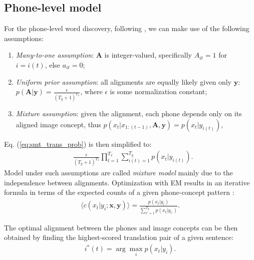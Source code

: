 \documentclass[journal]{IEEEtran}
\begin{document}
\subsection{Phone-level model}
 For the phone-level word discovery, following \cite{Brown92}, we can make use of the following assumptions:
\begin{enumerate}
    \item \textit{Many-to-one assumption}: $\mathbf{A}$ is integer-valued, specifically $A_{it}=1$ for $i=i(t)$, else $a_{it}=0$;
    \item \textit{Uniform prior assumption}: all alignments are equally likely given only $\mathbf{y}$: $p(\mathbf A|\mathbf y) = \frac{\epsilon}{(T_y+1)^{T_x}}$, where $\epsilon$ is some normalization constant;
    \item \textit{Mixture assumption}: given the alignment,
each phone depends only on its aligned image concept, thus
$p(x_t|x_{1:(t-1)},\mathbf{A},\mathbf{y})=p(x_t|y_{i(t)})$,
\end{enumerate}
Eq. (\ref{eq:smt_trans_prob}) is then simplified to:
\begin{align}
    &\frac{\epsilon}{(T_y+1)^{T_x}}\prod_{t=1}^{T_x}\sum_{i(t)=1}^{T_y} p(x_t|y_{i(t)}).
\end{align}
Model under such assumptions are called \textit{mixture model} mainly due to the independence between alignments. Optimization with EM results in 
an iterative formula
in terms of the expected counts of a given phone-concept pattern \cite{Brown93}:
\begin{align}
\label{eq:expected_count_ibm1}
    \langle c(x_t|y_i;\mathbf x, \mathbf y)\rangle = \frac{p(x_t|y_i)}{\sum_{i'=1}^{T_y}p(x_t|y_{i'})}.
\end{align}

The optimal alignment between the phones and image concepts can be then obtained by finding the highest-scored translation pair of a given sentence:
\begin{align}\label{eq:smt_alignment}
    i^*(t) = \arg\max_i p(x_t|y_i).
\end{align}
\end{document}
